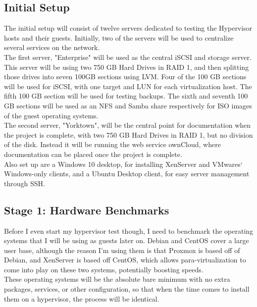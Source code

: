 \documentclass[12pt]{spieman}  %
\begin{document}
\subsection{Initial Setup}
\label{subsec:initial-setup}

The initial setup will consist of twelve servers dedicated to testing the Hypervisor hosts and their guests. Initially, two of the servers will be used to centralize several services on the network.\\

The first server, "Enterprise" will be used as the central iSCSI and storage server. This server will be using two 750 GB Hard Drives in RAID 1, and then splitting those drives into seven 100GB sections using LVM. Four of the 100 GB sections will be used for iSCSI, with one target and LUN for each virtualization host. The fifth 100 GB section will be used for testing backups. The sixth and seventh 100 GB sections will be used as an NFS and Samba share respectively for ISO images of the guest operating systems.\\

The second server, "Yorktown", will be the central point for documentation when the project is complete, with two 750 GB Hard Drives in RAID 1, but no division of the disk. Instead it will be running the web service ownCloud, where documentation can be placed once the project is complete.\\

Also set up are a Windows 10 desktop, for installing XenServer and VMwares` Windows-only clients, and a Ubuntu Desktop client, for easy server management through SSH.

\subsection{Stage 1: Hardware Benchmarks}
\label{subsec:stage-1}

Before I even start my hypervisor test though, I need to benchmark the operating systems that I will be using as guests later on. Debian and CentOS cover a large user base, although the reason I'm using them is that Proxmox is based off of Debian, and XenServer is based off CentOS, which allows para-virtualization to come into play on these two systems, potentially boosting speeds.\\

These operating systems will be the absolute bare minimum with no extra packages, services, or other configuration, so that when the time comes to install them on a hypervisor, the process will be identical.\\
\end{document}
